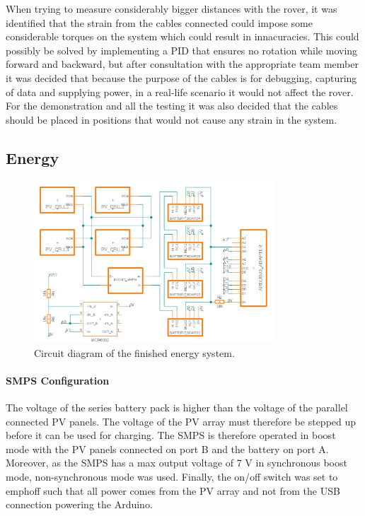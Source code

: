 \documentclass[a4paper]{article}
\begin{document}
When trying to measure considerably bigger distances with the rover, it was identified that the strain from the cables connected could impose some considerable torques on the system which could result in innacuracies.
This could possibly be solved by implementing a PID that ensures no rotation while moving forward and backward, but after consultation with the appropriate team member it was decided that because the purpose of the cables is for debugging, capturing of data and supplying power, in a real-life scenario it would not affect the rover.
For the demonstration and all the testing it was also decided that the cables should be placed in positions that would not cause any strain in the system.


\subsection{Energy}
\vspace{-10pt}
\begin{figure}[H]
    \centering
    \includegraphics[width=0.8\textwidth]{Circuit_Diagram.png}
    \caption{Circuit diagram of the finished energy system.}
    \label{fig:circuitDiagram}
\end{figure}

\paragraph*{SMPS Configuration}
The voltage of the series battery pack is higher than the voltage of 
the parallel connected PV panels. The voltage of the PV array must 
therefore be stepped up before it can be used for charging. The SMPS 
is therefore operated in boost mode with the PV panels connected on 
port B and the battery on port A. Moreover, as the SMPS has a max 
output voltage of 7 V in synchronous boost mode\cite{powerLogbook}, 
non-synchronous mode was used. Finally, the on/off switch was set 
to emph{off} such that all power comes from the PV array and not 
from the USB connection powering the Arduino.
\end{document}
